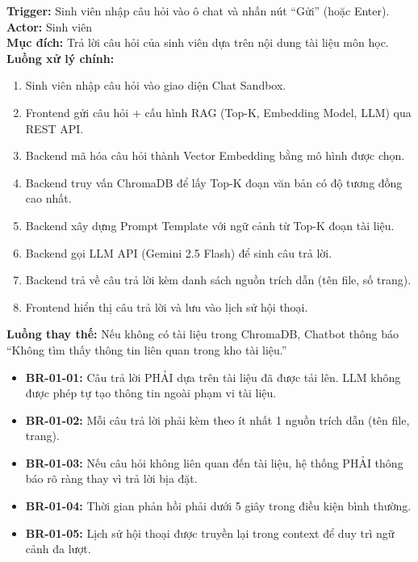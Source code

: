 \begin{funcbox}
  \textbf{Trigger:} Sinh viên nhập câu hỏi vào ô chat và nhấn nút ``Gửi'' (hoặc Enter).\\[4pt]
  \textbf{Actor:} Sinh viên\\
  \textbf{Mục đích:} Trả lời câu hỏi của sinh viên dựa trên nội dung tài liệu môn học.\\[4pt]
  \textbf{Luồng xử lý chính:}
  \begin{enumerate}[leftmargin=*, itemsep=2pt]
    \item Sinh viên nhập câu hỏi vào giao diện Chat Sandbox.
    \item Frontend gửi câu hỏi + cấu hình RAG (Top-K, Embedding Model, LLM) qua REST API.
    \item Backend mã hóa câu hỏi thành Vector Embedding bằng mô hình được chọn.
    \item Backend truy vấn ChromaDB để lấy Top-K đoạn văn bản có độ tương đồng cao nhất.
    \item Backend xây dựng Prompt Template với ngữ cảnh từ Top-K đoạn tài liệu.
    \item Backend gọi LLM API (Gemini 2.5 Flash) để sinh câu trả lời.
    \item Backend trả về câu trả lời kèm danh sách nguồn trích dẫn (tên file, số trang).
    \item Frontend hiển thị câu trả lời và lưu vào lịch sử hội thoại.
  \end{enumerate}
  \textbf{Luồng thay thế:} Nếu không có tài liệu trong ChromaDB, Chatbot thông báo ``Không tìm thấy thông tin liên quan trong kho tài liệu.''
\end{funcbox}

\begin{rulebox}
  \begin{itemize}[itemsep=2pt]
    \item \textbf{BR-01-01:} Câu trả lời PHẢI dựa trên tài liệu đã được tải lên. LLM không được phép tự tạo thông tin ngoài phạm vi tài liệu.
    \item \textbf{BR-01-02:} Mỗi câu trả lời phải kèm theo ít nhất 1 nguồn trích dẫn (tên file, trang).
    \item \textbf{BR-01-03:} Nếu câu hỏi không liên quan đến tài liệu, hệ thống PHẢI thông báo rõ ràng thay vì trả lời bịa đặt.
    \item \textbf{BR-01-04:} Thời gian phản hồi phải dưới 5 giây trong điều kiện bình thường.
    \item \textbf{BR-01-05:} Lịch sử hội thoại được truyền lại trong context để duy trì ngữ cảnh đa lượt.
  \end{itemize}
\end{rulebox}

